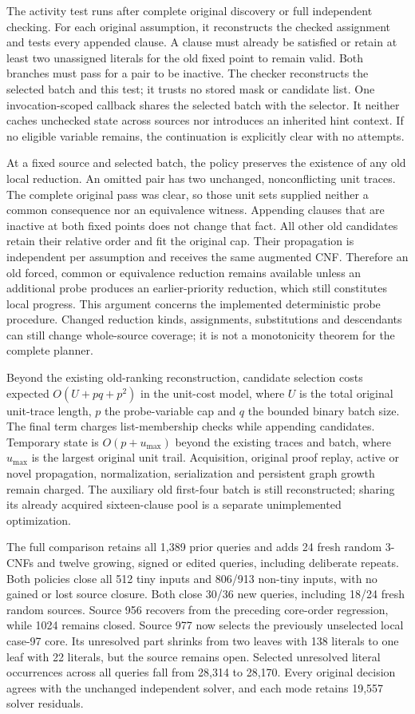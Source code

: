 \documentclass[11pt,a4paper]{article}
\numberwithin{equation}{section}
\theoremstyle{plain}
\theoremstyle{definition}
\theoremstyle{remark}
\begin{document}
The activity test runs after complete original discovery or full independent checking. For each original assumption, it reconstructs the checked assignment and tests every appended clause. A clause must already be satisfied or retain at least two unassigned literals for the old fixed point to remain valid. Both branches must pass for a pair to be inactive. The checker reconstructs the selected batch and this test; it trusts no stored mask or candidate list. One invocation-scoped callback shares the selected batch with the selector. It neither caches unchecked state across sources nor introduces an inherited hint context. If no eligible variable remains, the continuation is explicitly clear with no attempts.

At a fixed source and selected batch, the policy preserves the existence of any old local reduction. An omitted pair has two unchanged, nonconflicting unit traces. The complete original pass was clear, so those unit sets supplied neither a common consequence nor an equivalence witness. Appending clauses that are inactive at both fixed points does not change that fact. All other old candidates retain their relative order and fit the original cap. Their propagation is independent per assumption and receives the same augmented CNF. Therefore an old forced, common or equivalence reduction remains available unless an additional probe produces an earlier-priority reduction, which still constitutes local progress. This argument concerns the implemented deterministic probe procedure. Changed reduction kinds, assignments, substitutions and descendants can still change whole-source coverage; it is not a monotonicity theorem for the complete planner.

Beyond the existing old-ranking reconstruction, candidate selection costs expected $O(U+pq+p^2)$ in the unit-cost model, where $U$ is the total original unit-trace length, $p$ the probe-variable cap and $q$ the bounded binary batch size. The final term charges list-membership checks while appending candidates. Temporary state is $O(p+u_{\max})$ beyond the existing traces and batch, where $u_{\max}$ is the largest original unit trail. Acquisition, original proof replay, active or novel propagation, normalization, serialization and persistent graph growth remain charged. The auxiliary old first-four batch is still reconstructed; sharing its already acquired sixteen-clause pool is a separate unimplemented optimization.

The full comparison retains all 1,389 prior queries and adds 24 fresh random 3-CNFs and twelve growing, signed or edited queries, including deliberate repeats. Both policies close all 512 tiny inputs and 806/913 non-tiny inputs, with no gained or lost source closure. Both close 30/36 new queries, including 18/24 fresh random sources. Source 956 recovers from the preceding core-order regression, while 1024 remains closed. Source 977 now selects the previously unselected local case-97 core. Its unresolved part shrinks from two leaves with 138 literals to one leaf with 22 literals, but the source remains open. Selected unresolved literal occurrences across all queries fall from 28,314 to 28,170. Every original decision agrees with the unchanged independent solver, and each mode retains 19,557 solver residuals.
\end{document}
